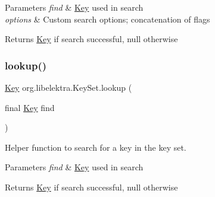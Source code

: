\begin{DoxyParams}{Parameters}
{\em find} & \hyperlink{classorg_1_1libelektra_1_1Key}{Key} used in search \\
\hline
{\em options} & Custom search options; concatenation of flags \\
\hline
\end{DoxyParams}
\begin{DoxyReturn}{Returns}
\hyperlink{classorg_1_1libelektra_1_1Key}{Key} if search successful, null otherwise 
\end{DoxyReturn}
\mbox{\label{classorg_1_1libelektra_1_1KeySet_a9ff1d475fd6ae316515c4c1cc173991b}} 
\subsubsection{\texorpdfstring{lookup()}{lookup()}\hspace{0.1cm}{\footnotesize\ttfamily [2/4]}}
{\footnotesize\ttfamily \hyperlink{classorg_1_1libelektra_1_1Key}{Key} org.\+libelektra.\+Key\+Set.\+lookup (\begin{DoxyParamCaption}\item[{final \hyperlink{classorg_1_1libelektra_1_1Key}{Key}}]{find }\end{DoxyParamCaption})\hspace{0.3cm}{\ttfamily [inline]}}



Helper function to search for a key in the key set. 


\begin{DoxyParams}{Parameters}
{\em find} & \hyperlink{classorg_1_1libelektra_1_1Key}{Key} used in search \\
\hline
\end{DoxyParams}
\begin{DoxyReturn}{Returns}
\hyperlink{classorg_1_1libelektra_1_1Key}{Key} if search successful, null otherwise 
\end{DoxyReturn}
\mbox{\label{classorg_1_1libelektra_1_1KeySet_aa17a04907eb8c8d2a9a488788d0039ea}} 
